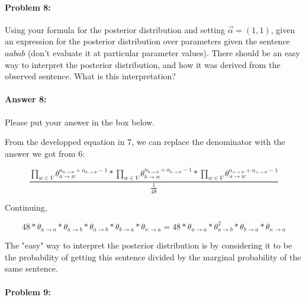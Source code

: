 \documentclass[10pt]{article}
\newenvironment{AnswerBox}{\begin{mdframed}[style=simple]}{\end{mdframed}}
\begin{document}
\hrulefill %

\paragraph{Problem 8:}

Using your formula for the posterior distribution and setting
$\vec{\alpha} = (1,1)$, given an expression for the posterior
distribution over parameters given the sentence $aabab$
(don't evaluate it at particular parameter values).
There should be an easy way to interpret the posterior distribution, and how it was
derived from the observed sentence. What is this interpretation?

\paragraph{Answer 8:} Please put your answer in the box below.


\begin{AnswerBox}%
From the developped equation in 7, we can replace the denominator with the answer we got from 6:

$$
\frac{ 
\prod _{w \in V} \theta_{a \rightarrow w}^{n_{a \rightarrow w} + \alpha_{a \rightarrow w} -1} *
\prod _{w \in V} \theta_{b \rightarrow w}^{n_{b \rightarrow w} + \alpha_{b \rightarrow w} -1} *
\prod _{w \in V} \theta_{\rtimes \rightarrow w}^{n_{\rtimes \rightarrow w} + \alpha_{\rtimes \rightarrow w} -1}}
{\frac{1}{48}}
$$

Continuing,

$$
48 *
\theta_{a \rightarrow a} *
\theta_{a \rightarrow b} *
\theta_{a \rightarrow b} *
\theta_{b \rightarrow a} *
\theta_{\ltimes \rightarrow a} =
48 *
\theta_{a \rightarrow a} *
\theta_{a \rightarrow b}^2 *
\theta_{b \rightarrow a} *
\theta_{\ltimes \rightarrow a}
$$

The "easy" way to interpret the posterior distribution is by considering it to be the probability of getting this sentence divided by the marginal probability of the same sentence.

    
\end{AnswerBox}%


\hrulefill %

\paragraph{Problem 9:}
\end{document}
